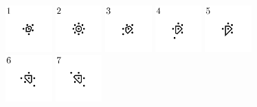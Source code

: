 \documentclass[text.tex]{subfiles}
\begin{document}
\begin{figure}[h!]
\centering
\includegraphics[width=0.16\textwidth]{img/results/circle8_concat/circle8_100000_(1_0alpha_1)_001.pdf}
\includegraphics[width=0.16\textwidth]{img/results/circle8_concat/circle8_100000_(1_0alpha_1)_002.pdf}
\includegraphics[width=0.16\textwidth]{img/results/circle8_concat/circle8_100000_(1_0alpha_1)_003.pdf}
\includegraphics[width=0.16\textwidth]{img/results/circle8_concat/circle8_100000_(1_0alpha_1)_004.pdf}
\includegraphics[width=0.16\textwidth]{img/results/circle8_concat/circle8_100000_(1_0alpha_1)_005.pdf}
\includegraphics[width=0.16\textwidth]{img/results/circle8_concat/circle8_100000_(1_0alpha_1)_006.pdf}
\includegraphics[width=0.16\textwidth]{img/results/circle8_concat/circle8_100000_(1_0alpha_1)_007.pdf}

\end{figure}
\end{document}

